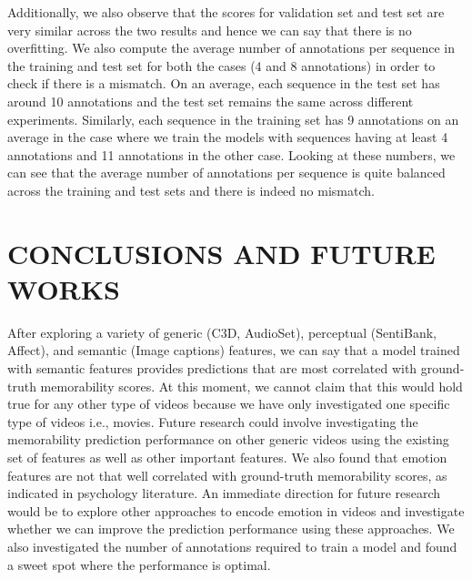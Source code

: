 \documentclass[sigconf]{acmart}
\begin{document}
Additionally, we also observe that the scores for validation set and test set are very similar across the two results and hence we can say that there is no overfitting.
We also compute the average number of annotations per sequence in the training and test set for both the cases (4 and 8 annotations) in order to check if there is a mismatch.
On an average, each sequence in the test set has around 10 annotations and the test set remains the same across different experiments.
Similarly, each sequence in the training set has 9 annotations on an average in the case where we train the models with sequences having at least 4 annotations and 11 annotations in the other case.
Looking at these numbers, we can see that the average number of annotations per sequence is quite balanced across the training and test sets and there is indeed no mismatch.

\section{CONCLUSIONS AND FUTURE WORKS}
After exploring a variety of generic (C3D, AudioSet), perceptual (SentiBank, Affect), and semantic (Image captions) features, we can say that a model trained with  semantic features provides predictions that are most correlated with ground-truth memorability scores.
At this moment, we cannot claim that this would hold true for any other type of videos because we have only investigated one specific type of videos i.e., movies.
Future research could involve investigating the memorability prediction performance on other generic videos using the existing set of features as well as other important features.
We also found that emotion features are not that well correlated with ground-truth memorability scores, as indicated in psychology literature.
An immediate direction for future research would be to explore other approaches to encode emotion in videos and investigate whether we can improve the prediction performance using these approaches.
We also investigated the number of annotations required to train a model and found a sweet spot where the performance is optimal.
\end{document}
